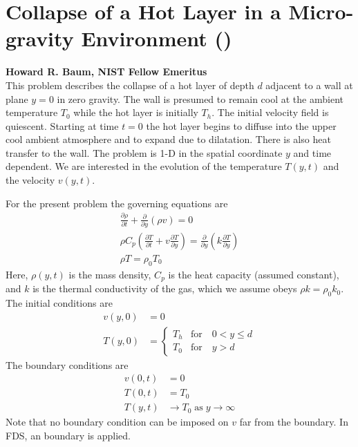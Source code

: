 \documentclass[11pt]{book}
\begin{document}
\section{Collapse of a Hot Layer in a Micro-gravity Environment (\texorpdfstring{}{hot\_layer\_360})}
\label{sec:baum_hot_layer}

\textbf{Howard R. Baum, NIST Fellow Emeritus}\\

\noindent This problem describes the collapse of a hot layer of depth $d$ adjacent to a wall at plane $y=0$ in zero gravity.  The wall is presumed to remain cool at the ambient temperature $T_0$ while the hot layer is initially $T_h$.  The initial velocity field is quiescent.  Starting at time $t=0$ the hot layer begins to diffuse into the upper cool ambient atmosphere and to expand due to dilatation.  There is also heat transfer to the wall.  The problem is 1-D in the spatial coordinate $y$ and time dependent.  We are interested in the evolution of the temperature $T(y,t)$ and the velocity $v(y,t)$.

For the present problem the governing equations are
\begin{gather}
\frac{\partial \rho}{\partial t} + \frac{\partial}{\partial y}(\rho v) = 0 \\
\rho C_p \left( \frac{\partial T}{\partial t} + v \frac{\partial T}{\partial y} \right) = \frac{\partial}{\partial y} \left( k \frac{\partial T}{\partial y} \right) \\
\rho T = \rho_0 T_0
\end{gather}
Here, $\rho(y,t)$ is the mass density, $C_p$ is the heat capacity (assumed constant), and $k$ is the thermal conductivity of the gas, which we assume obeys $\rho k = \rho_0 k_0$. The initial conditions are
\begin{align}
v(y,0) &= 0 \\
T(y,0) &= \left\{ \begin{array}{ll} T_h & \mbox{for} \quad 0 < y \le d \\ T_0 & \mbox{for} \quad y > d \end{array} \right.
\end{align}
The boundary conditions are
\begin{align}
v(0,t) &= 0 \\
T(0,t) &= T_0 \\
T(y,t) &\rightarrow T_0 \;\mbox{as}\; y\rightarrow\infty
\end{align}
Note that no boundary condition can be imposed on $v$ far from the boundary.  In FDS, an  boundary is applied.
\end{document}
